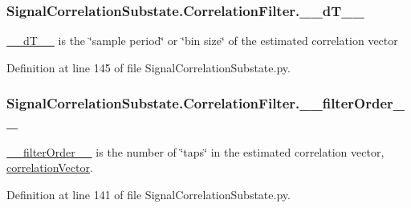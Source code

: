 \subsubsection[{\texorpdfstring{\+\_\+\+\_\+d\+T\+\_\+\+\_\+}{__dT__}}]{\setlength{\rightskip}{0pt plus 5cm}Signal\+Correlation\+Substate.\+Correlation\+Filter.\+\_\+\+\_\+d\+T\+\_\+\+\_\+\hspace{0.3cm}{\ttfamily [private]}}\hypertarget{classSignalCorrelationSubstate_1_1CorrelationFilter_a0f3b9de9415899aa7d41f0b67216eb99}{}\label{classSignalCorrelationSubstate_1_1CorrelationFilter_a0f3b9de9415899aa7d41f0b67216eb99}


\hyperlink{classSignalCorrelationSubstate_1_1CorrelationFilter_a0f3b9de9415899aa7d41f0b67216eb99}{\+\_\+\+\_\+d\+T\+\_\+\+\_\+} is the \char`\"{}sample period\char`\"{} or \char`\"{}bin size\char`\"{} of the estimated correlation vector 



Definition at line 145 of file Signal\+Correlation\+Substate.\+py.

\subsubsection[{\texorpdfstring{\+\_\+\+\_\+filter\+Order\+\_\+\+\_\+}{__filterOrder__}}]{\setlength{\rightskip}{0pt plus 5cm}Signal\+Correlation\+Substate.\+Correlation\+Filter.\+\_\+\+\_\+filter\+Order\+\_\+\+\_\+\hspace{0.3cm}{\ttfamily [private]}}\hypertarget{classSignalCorrelationSubstate_1_1CorrelationFilter_a668625040b858deeb1a7e3ad8649abeb}{}\label{classSignalCorrelationSubstate_1_1CorrelationFilter_a668625040b858deeb1a7e3ad8649abeb}


\hyperlink{classSignalCorrelationSubstate_1_1CorrelationFilter_a668625040b858deeb1a7e3ad8649abeb}{\+\_\+\+\_\+filter\+Order\+\_\+\+\_\+} is the number of \char`\"{}taps\char`\"{} in the estimated correlation vector, \hyperlink{classSignalCorrelationSubstate_1_1CorrelationFilter_ae308a025a3a7ebdf4e66b5fd3fdf2b7d}{correlation\+Vector}. 



Definition at line 141 of file Signal\+Correlation\+Substate.\+py.

